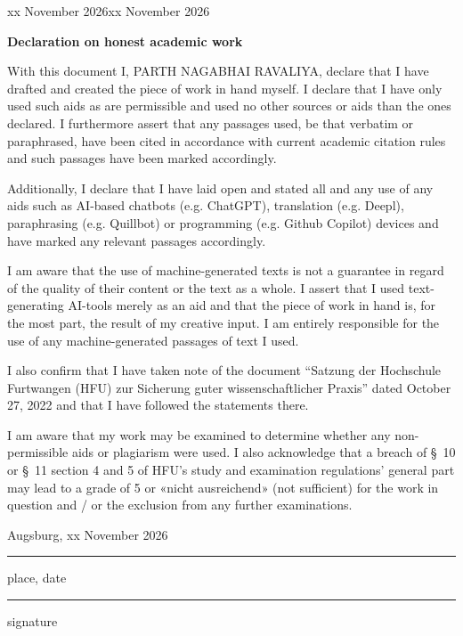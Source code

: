 \clearpage
\begingroup
\def\HFUSigningDate{xx November 2026}
\def\HFUPlaceholderDate{xx November 2026}
\ifx\HFUSigningDate\HFUPlaceholderDate
\fi
\thispagestyle{empty}
\renewcommand{\baselinestretch}{1}\normalsize
\raggedright
\setlength{\parindent}{0pt}
\setlength{\parskip}{0.7\baselineskip}
{\Large\bfseries Declaration on honest academic work\par}
\medskip

With this document I, PARTH NAGABHAI RAVALIYA, declare that I have drafted and created the piece of work in hand myself. I declare that I have only used such aids as are permissible and used no other sources or aids than the ones declared. I furthermore assert that any passages used, be that verbatim or paraphrased, have been cited in accordance with current academic citation rules and such passages have been marked accordingly.

Additionally, I declare that I have laid open and stated all and any use of any aids such as AI-based chatbots (e.g. ChatGPT), translation (e.g. Deepl), paraphrasing (e.g. Quillbot) or programming (e.g. Github Copilot) devices and have marked any relevant passages accordingly.

I am aware that the use of machine-generated texts is not a guarantee in regard of the quality of their content or the text as a whole. I assert that I used text-generating AI-tools merely as an aid and that the piece of work in hand is, for the most part, the result of my creative input. I am entirely responsible for the use of any machine-generated passages of text I used.

I also confirm that I have taken note of the document “Satzung der Hochschule Furtwangen (HFU) zur Sicherung guter wissenschaftlicher Praxis” dated October 27, 2022 and that I have followed the statements there.

I am aware that my work may be examined to determine whether any non-permissible aids or plagiarism were used. I also acknowledge that a breach of §~10 or §~11 section 4 and 5 of HFU’s study and examination regulations’ general part may lead to a grade of 5 or «nicht ausreichend» (not sufficient) for the work in question and / or the exclusion from any further examinations.

\vspace{2\baselineskip}
\noindent
\begin{minipage}[b]{0.47\linewidth}
  Augsburg, \HFUSigningDate\par
  \nointerlineskip\smallskip\hrule\smallskip
  {\small place, date\par}
\end{minipage}\hfill
\begin{minipage}[b]{0.43\linewidth}
  \hrule\smallskip
  {\small signature\par}
\end{minipage}
\par
\clearpage
\endgroup
